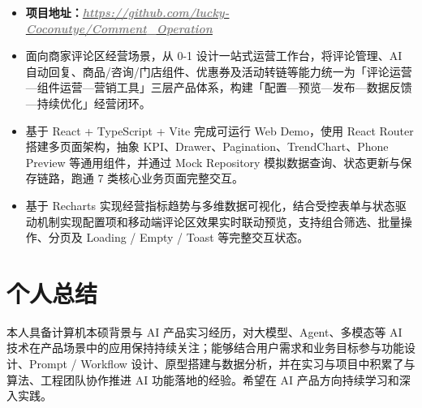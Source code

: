 \documentclass{resume}
\newcommand{\projectlink}[2]{\href{#1}{\textcolor{gray}{\textbf{\textit{#2}}}}}
\begin{document}
\begin{itemize}
  \item \textbf{项目地址：}\projectlink{https://github.com/lucky-Coconutye/Comment_Operation}{https://github.com/lucky-Coconutye/Comment\_Operation}
  \item 面向商家评论区经营场景，从 0-1 设计一站式运营工作台，将评论管理、AI 自动回复、商品/咨询/门店组件、优惠券及活动转链等能力统一为「评论运营—组件运营—营销工具」三层产品体系，构建「配置—预览—发布—数据反馈—持续优化」经营闭环。
  \item 基于 React + TypeScript + Vite 完成可运行 Web Demo，使用 React Router 搭建多页面架构，抽象 KPI、Drawer、Pagination、TrendChart、Phone Preview 等通用组件，并通过 Mock Repository 模拟数据查询、状态更新与保存链路，跑通 7 类核心业务页面完整交互。
  \item 基于 Recharts 实现经营指标趋势与多维数据可视化，结合受控表单与状态驱动机制实现配置项和移动端评论区效果实时联动预览，支持组合筛选、批量操作、分页及 Loading / Empty / Toast 等完整交互状态。
\end{itemize}

\section{个人总结}
本人具备计算机本硕背景与 AI 产品实习经历，对大模型、Agent、多模态等 AI 技术在产品场景中的应用保持持续关注；能够结合用户需求和业务目标参与功能设计、Prompt / Workflow 设计、原型搭建与数据分析，并在实习与项目中积累了与算法、工程团队协作推进 AI 功能落地的经验。希望在 AI 产品方向持续学习和深入实践。
\end{document}
